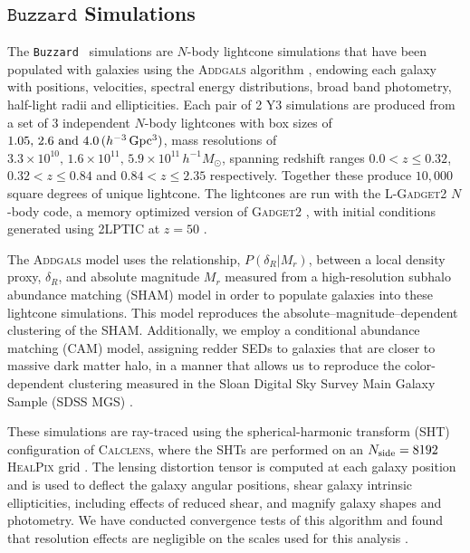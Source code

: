 \documentclass[fleqn,usenatbib]{mnras}
\newcommand{\buzzard}{\texttt{Buzzard} }
\begin{document}

\subsection{$\buzzard$ Simulations}

The \buzzard\ simulations are $N$-body lightcone simulations that have been populated with galaxies using the \textsc{Addgals} algorithm \citep{Addgals}, endowing each galaxy with positions, velocities, spectral energy distributions, broad band photometry, half-light radii and ellipticities. Each pair of 2 Y3 simulations are produced from a set of 3 independent $N$-body lightcones with box sizes of $1.05,\, 2.6 \textrm{ and } 4.0\, (h^{-3}\, \rm Gpc^3)$, mass resolutions of $3.3\times10^{10},\, 1.6\times10^{11},\, 5.9\times10^{11}\, h^{-1}M_{\odot}$, spanning redshift ranges $0.0< z \leq 0.32$, $0.32< z \leq 0.84$ and $0.84< z \leq 2.35$ respectively. Together these produce $10,000$ square degrees of unique lightcone. The lightcones are run with the \textsc{L-Gadget2} $N$-body code, a memory optimized version of \textsc{Gadget2} \citet{Springel_2005}, with initial conditions generated using \textsc{2LPTIC} at $z=50$ \citep{Crocce2012}. 

The \textsc{Addgals} model uses the relationship, $P(\delta_{R}|M_r)$, between a local density proxy, $\delta_{R}$, and absolute magnitude $M_r$ measured from a high-resolution subhalo abundance matching (SHAM) model in order to populate galaxies into these lightcone simulations. This model reproduces the absolute--magnitude--dependent clustering of the SHAM. Additionally, we employ a conditional abundance matching (CAM) model, assigning redder SEDs to galaxies that are closer to massive dark matter halo, in a manner that allows us to reproduce the color-dependent clustering measured in the Sloan Digital Sky Survey Main Galaxy Sample (SDSS MGS) \citep{Addgals, DeRose2020b}. 

These simulations are ray-traced using the spherical-harmonic transform (SHT) configuration of \textsc{Calclens}, where the SHTs are performed on an $N_{\rm side}=8192$ \textsc{HealPix} grid \citep{Becker2013}. The lensing distortion tensor is computed at each galaxy position and is used to deflect the galaxy angular positions, shear galaxy intrinsic ellipticities, including effects of reduced shear, and magnify galaxy shapes and photometry. We have conducted convergence tests of this algorithm and found that resolution effects are negligible on the scales used for this analysis \citep{DeRose2019}.
\end{document}
